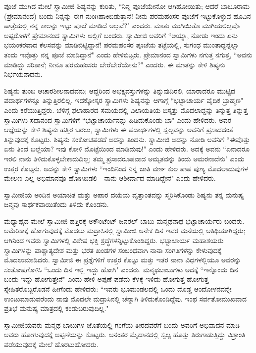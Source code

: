 ಪೂಜೆ ಮುಗಿದ ಮೇಲೆ ಸ್ವಾಮೀಜಿ ಶಿಷ್ಯನನ್ನು ಕುರಿತು, “ನಿನ್ನ ಪೂಜೆಯೇನೋ ಆಗಿಹೋಯಿತು; ಆದರೆ ಬಾಬೂರಾಮ (ಪ್ರೇಮಾನಂದ) ಬಂದು ನಿನ್ನನ್ನು ಈಗ ನುಂಗಿಹಾಕಿಬಿಡುತ್ತಾನೆ! ನೀನು ಪರಮಹಂಸರ ಪೂಜೆಗೆ ಇಟ್ಟುಕೊಳ್ಳುವ ಹೂವಿನ ಪಾತ್ರೆಯಲ್ಲಿ ನನ್ನ ಕಾಲನ್ನು ಇಟ್ಟು ಪೂಜೆ ಮಾಡಿದೆ ಅಲ್ಲವೆ?" ಎಂದರು. ಮಾತು ಮುಗಿಯಿತೊ ಮುಗಿಯಲಿಲ್ಲವೊ ಅಷ್ಟರೊಳಗೆ ಪ್ರೇಮಾನಂದ ಸ್ವಾಮಿಗಳು ಅಲ್ಲಿಗೆ ಬಂದರು. ಸ್ವಾಮೀಜಿ ಅವರಿಗೆ “ಅಯ್ಯಾ, ನೋಡು ಇಂದು ಏನು ಭಯಂಕರವಾದ ಕೆಲಸವನ್ನು ಮಾಡಿಬಿಟ್ಟಿದ್ದಾನೆ! ಪರಮಹಂಸರ ಪೂಜೆಯ ತಟ್ಟೆಯಲ್ಲಿ, ಸುಗಂಧ ಮುಂತಾದ್ದನ್ನೆಲ್ಲಾ ತಂದು ಇವೊತ್ತು ನನ್ನ ಪೂಜೆ ಮಾಡಿದ್ದಾನೆ" ಎಂದು ಹೇಳಿಬಿಟ್ಟರು. ಪ್ರೇಮಾನಂದ ಸ್ವಾಮಿಗಳು ನಗುತ್ತ ನಗುತ್ತ, “ಅವನು ಮಾಡಿದ್ದು ಸರಿತಾನೆ; ನೀನೂ ಪರಮಹಂಸರು ಬೇರೆಬೇರೆಯೇನು?" ಎಂದರು. ಈ ಮಾತನ್ನು ಕೇಳಿ ಶಿಷ್ಯನು ನಿರ್ಭಯನಾದನು.

ಶಿಷ್ಯನು ತುಂಬ ಆಚಾರಶೀಲನಾದವನು; ಆದ್ದರಿಂದ ಅಭಕ್ಷ್ಯವಸ್ತುಗಳನ್ನು ತಿನ್ನುವುದಿರಲಿ, ಯಾರಾದರೂ ಮುಟ್ಟಿದ ಪದಾರ್ಥಗಳನ್ನೂ ತಿನ್ನುತ್ತಿರಲಿಲ್ಲ. ಇದಕ್ಕೋಸ್ಕರ ಸ್ವಾಮಿಗಳು ಶಿಷ್ಯನನ್ನು ಆಗಾಗ್ಗೆ “ಭಟ್ಟಾಚಾರ್ಯ ವೈದಿಕ ಬ್ರಾಹ್ಮಣ" ಎಂದು ಕರೆಯುತ್ತಿದ್ದರು. ಬೆಳಿಗ್ಗೆ ಫಲಾಹಾರದ ಸಮಯದಲ್ಲಿ ವಿಲಾಯತಿಯ ಬಿಸ್ಕತ್ತು ಮೊದಲಾದ್ದನ್ನು ತಿನ್ನುತ್ತ ತಿನ್ನುತ್ತ ಸ್ವಾಮಿಗಳು ಸದಾನಂದ ಸ್ವಾಮಿಗಳಿಗೆ “ಭಟ್ಟಾಚಾರ್ಯನನ್ನು ಹಿಡಿದುಕೊಂಡು ಬಾ" ಎಂದು ಹೇಳಿದರು. ಅವರ ಆಜ್ಞೆಯನ್ನು ಕೇಳಿ ಶಿಷ್ಯನು ಹತ್ತಿರ ಬರಲು, ಸ್ವಾಮಿಗಳು ಈ ಪದಾರ್ಥಗಳಲ್ಲಿ ಸ್ವಲ್ಪವನ್ನು ಅವನಿಗೆ ಪ್ರಸಾದದಂತೆ ತಿನ್ನುವುದಕ್ಕೆ ಕೊಟ್ಟರು. ಶಿಷ್ಯನು ಸಂಕೋಚಪಡದೆ ಅದನ್ನು ತಿಂದನು. ಸ್ವಾಮೀಜಿ ಅದನ್ನು ನೋಡಿ ಅವನಿಗೆ “ಈವೊತ್ತು ಏನು ತಿಂದೆ ಬಲ್ಲೆಯಾ? ಇವು ಕೋಳಿ ಮೊಟ್ಟೆಯಿಂದ ಮಾಡಿದುವು!" ಎಂದು ಹೇಳಿದರು. ಅದಕ್ಕೆ ಅವನು “ಏನಾದರೂ ಇರಲಿ ನಾನು ತಿಳಿದುಕೊಳ್ಳಬೇಕಾದುದಿಲ್ಲ; ತಮ್ಮ ಪ್ರಸಾದರೂಪವಾದ ಅಮೃತವನ್ನು ತಿಂದು ಅಮರನಾದೆನು" ಎಂದು ಉತ್ತರ ಕೊಟ್ಟನು. ಅದನ್ನು ಕೇಳಿ ಸ್ವಾಮಿಗಳು “ಇಂದಿನಿಂದ ನಿನ್ನ ಜಾತಿ ವರ್ಣ ಕುಲ ಪಾಪ ಪುಣ್ಯ ಮೊದಲಾದುವುಗಳ ಮೇಲಣ ಎಲ್ಲ ಅಭಿಮಾನವೂ ಹೋಗಿಬಿಡಲಿ - ನಾನು ಆಶೀರ್ವಾದ ಮಾಡಿದ್ದೇನೆ" ಎಂದು ಹೇಳಿದರು.

ಸ್ವಾಮೀಜಿಯ ಅಂದಿನ ಅಯಾಚಿತ ಮತ್ತು ಅಪಾರ ದಯೆಯ ವೃತ್ತಾಂತವನ್ನು ಸ್ಮರಿಸಿಕೊಂಡು ಶಿಷ್ಯನು ತನ್ನ ಮನುಷ್ಯ ಜನ್ಮವು ಸಾರ್ಥಕವಾಯಿತೆಂದು ತಿಳಿದು ಕೊಂಡನು.

ಮಧ್ಯಾಹ್ನದ ಮೇಲೆ ಸ್ವಾಮೀಜಿ ಹತ್ತಿರಕ್ಕೆ ಅಕೌಂಟೆಂಟ್ ಜನರಲ್ ಬಾಬು ಮನ್ಮಥನಾಥ ಭಟ್ಟಾಚಾರ್ಯರು ಬಂದರು. ಅಮೆರಿಕಾಕ್ಕೆ ಹೋಗುವುದಕ್ಕೆ ಮೊದಲು ಮದ್ರಾಸಿನಲ್ಲಿ ಸ್ವಾಮೀಜಿ ಅನೇಕ ದಿನ ಇವರ ಮನೆಯಲ್ಲಿ ಅತಿಥಿಯಾಗಿದ್ದರು; ಆಗಿನಿಂದ ಇವರು ಸ್ವಾಮಿಗಳಲ್ಲಿ ವಿಶೇಷ ಭಕ್ತಿ ಶ್ರದ್ಧೆಗಳನ್ನಿಟ್ಟುಕೊಂಡಿದ್ದರು. ಭಟ್ಟಾಚಾರ್ಯ ಮಹಾಶಯರು ಸ್ವಾಮಿಗಳನ್ನು ಪಾಶ್ಚಾತ್ಯದೇಶ ಮತ್ತು ಭರತ ಖಂಡಗಳ ಸಂಬಂಧವಾಗಿ ನಾನಾ ಸಂಗತಿಗಳನ್ನು ಕೇಳುವುದಕ್ಕೆ ಮೊದಲುಮಾಡಿದರು. ಸ್ವಾಮೀಜಿ ಈ ಪ್ರಶ್ನೆಗಳಿಗೆ ಉತ್ತರ ಕೊಟ್ಟು ಮತ್ತು ಇತರ ನಾನಾ ವಿಧಗಳಲ್ಲಿಯೂ ಅವರನ್ನು ಸಂತೋಷಗೊಳಿಸಿ “ಒಂದು ದಿನ ಇಲ್ಲಿ ಇದ್ದು ಹೋಗಿ" ಎಂದರು. ಮನ್ಮಥಬಾಬುಗಳು ಅದಕ್ಕೆ “ಇನ್ನೊಂದು ದಿನ ಬಂದು ಇದ್ದು ಹೋಗುತ್ತೇನೆ" ಎಂದು ಹೇಳಿ ಅಪ್ಪಣೆ ಪಡೆದು ಕೆಳಕ್ಕೆ ಇಳಿದು ಹೋಗುತ್ತ ಹೋಗುತ್ತ ಸ್ನೇಹಿತರೊಬ್ಬರೊಡನೆ ಹೀಗೆಂದು ಹೇಳಿದರು: “ಇವರು ಭೂಮಂಡಲದಲ್ಲಿ ಒಂದು ದೊಡ್ಡ ಆಂದೋಳನವನ್ನೇ ಉಂಟುಮಾಡುವರೆಂದು ನಾವು ಮೊದಲೇ ಮದ್ರಾಸಿನಲ್ಲಿ ಚೆನ್ನಾಗಿ ತಿಳಿದುಕೊಂಡಿದ್ದೆವು. ಇಂಥ ಸರ್ವತೋಮುಖವಾದ ಪ್ರತಿಭೆ ಮನುಷ್ಯ ಮಾತ್ರದಲ್ಲಿ ಕಂಡುಬರುವುದಿಲ್ಲ."

ಸ್ವಾಮೀಜಿಯವರು ಮನ್ಮಥ ಬಾಬುಗಳ ಜೊತೆಯಲ್ಲಿ ಗಂಗೆಯ ತೀರದವರೆಗೆ ಬಂದು ಅವರಿಗೆ ಅಭಿವಾದನ ಮಾಡಿ ಅವರು ಹೋಗುವುದಕ್ಕೆ ಅಪ್ಪಣೆಯನ್ನು ಕೊಟ್ಟರು. ಅನಂತರ ಮೈದಾನದಲ್ಲಿ ಸ್ವಲ್ಪ ಹೊತ್ತು ತಿರುಗಾಡುತ್ತಿದ್ದು ವಿಶ್ರಾಂತಿ ಪಡೆಯುವುದಕ್ಕೆ ಮೇಲೆ ಹೊರಟುಹೋದರು.

